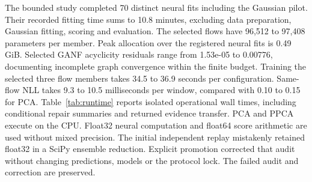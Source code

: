 The bounded study completed 70 distinct neural fits including the Gaussian pilot. Their recorded fitting time sums to 10.8 minutes, excluding data preparation, Gaussian fitting, scoring and evaluation. The selected flows have 96,512 to 97,408 parameters per member. Peak allocation over the registered neural fits is 0.49 GiB. Selected GANF acyclicity residuals range from 1.53e-05 to 0.00776, documenting incomplete graph convergence within the finite budget. Training the selected three flow members takes 34.5 to 36.9 seconds per configuration. Same-flow NLL takes 9.3 to 10.5 milliseconds per window, compared with 0.10 to 0.15 for PCA. Table~\ref{tab:runtime} reports isolated operational wall times, including conditional repair summaries and returned evidence transfer. PCA and PPCA execute on the CPU. Float32 neural computation and float64 score arithmetic are used without mixed precision. The initial independent replay mistakenly retained float32 in a SciPy ensemble reduction. Explicit promotion corrected that audit without changing predictions, models or the protocol lock. The failed audit and correction are preserved.
